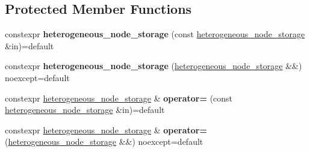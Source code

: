 \subsection*{Protected Member Functions}
\begin{DoxyCompactItemize}
\item 
\mbox{\label{classsequoia_1_1maths_1_1graph__impl_1_1heterogeneous__node__storage_a51fabc8b13c844d6bd883d72f66c4df7}} 
constexpr {\bfseries heterogeneous\+\_\+node\+\_\+storage} (const \mbox{\hyperlink{classsequoia_1_1maths_1_1graph__impl_1_1heterogeneous__node__storage}{heterogeneous\+\_\+node\+\_\+storage}} \&in)=default
\item 
\mbox{\label{classsequoia_1_1maths_1_1graph__impl_1_1heterogeneous__node__storage_a7e23d5e0e770d29243cf9b83f9db169f}} 
constexpr {\bfseries heterogeneous\+\_\+node\+\_\+storage} (\mbox{\hyperlink{classsequoia_1_1maths_1_1graph__impl_1_1heterogeneous__node__storage}{heterogeneous\+\_\+node\+\_\+storage}} \&\&) noexcept=default
\item 
\mbox{\label{classsequoia_1_1maths_1_1graph__impl_1_1heterogeneous__node__storage_aa562d9198d14f55830999c2f56d2df50}} 
constexpr \mbox{\hyperlink{classsequoia_1_1maths_1_1graph__impl_1_1heterogeneous__node__storage}{heterogeneous\+\_\+node\+\_\+storage}} \& {\bfseries operator=} (const \mbox{\hyperlink{classsequoia_1_1maths_1_1graph__impl_1_1heterogeneous__node__storage}{heterogeneous\+\_\+node\+\_\+storage}} \&in)=default
\item 
\mbox{\label{classsequoia_1_1maths_1_1graph__impl_1_1heterogeneous__node__storage_a9603c52baf324473e880f73a7b471ef1}} 
constexpr \mbox{\hyperlink{classsequoia_1_1maths_1_1graph__impl_1_1heterogeneous__node__storage}{heterogeneous\+\_\+node\+\_\+storage}} \& {\bfseries operator=} (\mbox{\hyperlink{classsequoia_1_1maths_1_1graph__impl_1_1heterogeneous__node__storage}{heterogeneous\+\_\+node\+\_\+storage}} \&\&) noexcept=default
\end{DoxyCompactItemize}
